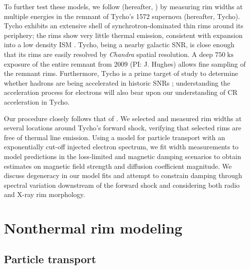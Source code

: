 \documentclass[manuscript]{aastex}  %
\newcommand*{\mt}{\mathrm}
\newcommand*{\unit}[1]{\;\mt{#1}}  %
\begin{document}
To further test these models, we follow \citet{ressler2014} (hereafter,
) by measuring rim widths at multiple energies in the
remnant of Tycho's 1572 supernova (hereafter, Tycho).  Tycho exhibits an
extensive shell of synchrotron-dominated thin rims around its periphery; the
rims show very little thermal emission, consistent with expansion into a low
density ISM \citep{williams2013}.  Tycho, being a nearby galactic SNR, is close
enough that its rims are easily resolved by \textit{Chandra} spatial
resolution. A deep $750 \unit{ks}$ exposure of the entire remnant from 2009
(PI: J. Hughes) allows fine sampling of the remnant rims.  Furthermore, Tycho
is a prime target of study to determine whether hadrons are being accelerated
in historic SNRs \citep[and references therein]{morlino2012}; understanding the
acceleration process for electrons will also bear upon our understanding of CR
acceleration in Tycho.

Our procedure closely follows that of .
We selected and measured rim widths at several locations around Tycho's forward
shock, verifying that selected rims are free of thermal line emission.  Using a
model for particle transport with an exponentially cut-off injected electron
spectrum, we fit width measurements to model predictions in the loss-limited
and magnetic damping scenarios to obtain estimates on magnetic field strength
and diffusion coefficient magnitude.  We discuss degeneracy in our model fits
and attempt to constrain damping through spectral variation downstream of the
forward shock and considering both radio and X-ray rim morphology.

\section{Nonthermal rim modeling}\label{sec:models}

\subsection{Particle transport}\label{sec:transport}
\end{document}
